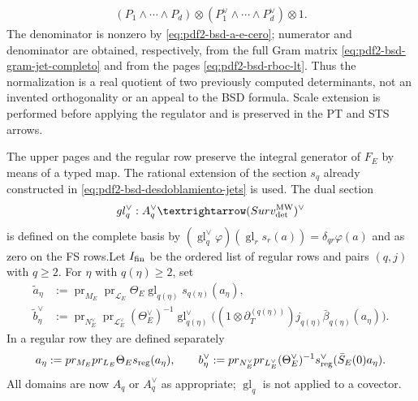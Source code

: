\begin{proposition}
\begin{equation}
\begin{aligned}
 (P_1\wedge\cdots\wedge P_d)
 \otimes(P_1^\vee\wedge\cdots\wedge P_d^\vee)\otimes1.
 \end{aligned}
\end{equation}
The denominator is nonzero by \eqref{eq:pdf2-bsd-a-e-cero}; numerator and
denominator are obtained, respectively, from the full Gram matrix
\eqref{eq:pdf2-bsd-gram-jet-completo} and from the pages
\eqref{eq:pdf2-bsd-rboc-lt}. Thus the normalization is a real quotient of two
previously computed determinants, not an invented orthogonality or an
appeal to the BSD formula. Scale extension is performed before
applying the regulator and is preserved in the PT and STS arrows.

The upper pages and the regular row preserve the integral generator of
$F_E$ by means of a typed map. The rational extension of the section
$s_q$ already constructed in \eqref{eq:pdf2-bsd-desdoblamiento-jets} is used. The dual section
\begin{equation}\label{eq:pdf2-bsd-glue-dual-tipado}
 \operatorname{gl}_q^\vee:A_q^\vee\longrightarrow
   (\operatorname{Surv}_{\rm det}^{\rm MW})^\vee
\end{equation}
is defined on the complete basis by
$(\operatorname{gl}_q^\vee\varphi)
(\operatorname{gl}_r s_r(a))=\delta_{qr}\varphi(a)$ and as zero on the
FS rows.\@ Let $\mathcal I_{\rm fin}$ be the ordered list of regular rows and pairs
$(q,j)$ with $q\geq2$. For $\eta$ with $q(\eta)\geq2$, set
\begin{equation}\label{eq:pdf2-bsd-lifts-filas-smith}
 \begin{aligned}
 \widetilde a_\eta&:=\operatorname{pr}_{M_E}\operatorname{pr}_{\mathcal L_E}
   \Theta_E\operatorname{gl}_{q(\eta)}s_{q(\eta)}(a_\eta),\\
 \widetilde b_\eta^\vee&:=
   \operatorname{pr}_{N_E^\vee}\operatorname{pr}_{\mathcal L_E^\vee}
   (\Theta_E^\vee)^{-1}\operatorname{gl}_{q(\eta)}^\vee
   \bigl((1\otimes\partial_T^{(q(\eta))})
      j_{q(\eta)}\bar\beta_{q(\eta)}(a_\eta)\bigr).
 \end{aligned}
\end{equation}
In a regular row they are defined separately
\begin{equation}\label{eq:pdf2-bsd-lifts-fila-regular}
 \widetilde a_\eta:=
 \operatorname{pr}_{M_E}\operatorname{pr}_{\mathcal L_E}
 \Theta_Es_{\rm reg}(a_\eta),
 \qquad
 \widetilde b_\eta^\vee:=
 \operatorname{pr}_{N_E^\vee}\operatorname{pr}_{\mathcal L_E^\vee}
 (\Theta_E^\vee)^{-1}s_{\rm reg}^\vee
 (\bar S_E(0)a_\eta).
\end{equation}
All domains are now $A_q$ or $A_q^\vee$ as appropriate;
$\operatorname{gl}_q$ is not applied to a covector.


\end{proposition}
